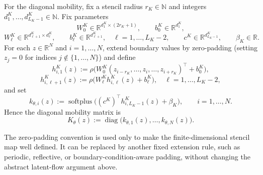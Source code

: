 \documentclass[hidelinks,review,nohypdvips,onefignum,onetabnum]{siamart220329}
\newcommand{\N}{\mathbb{N}}
\newcommand{\R}{\mathbb{R}}
\newcommand{\diag}{\operatorname{diag}}
\newcommand{\softplus}{\operatorname{softplus}}
\begin{document}
\begin{definition}
For the diagonal mobility, fix a stencil radius \(r_K\in \N\) and integers \(d_1^K,\dots,d_{L_K-1}^K\in \N\). Fix parameters
\begin{equation}\label{eq:K-params}
W_0^K\in \R^{d_1^K\times (2r_K+1)}, \qquad b_0^K\in \R^{d_1^K},
\end{equation}
\begin{equation*}
W_{\ell}^K\in \R^{d_{\ell+1}^K\times d_{\ell}^K}, \qquad b_{\ell}^K\in \R^{d_{\ell+1}^K}, \quad \ell=1,\dots,L_K-2,
\qquad c^K\in \R^{d_{L_K-1}^K}, \qquad \beta_K\in \R.
\end{equation*}
For each \(z\in\R^N\) and \(i=1,\dots,N\), extend boundary values by zero-padding (setting \(z_j=0\) for indices \(j\notin\{1,\dots,N\}\)) and define
\begin{equation}\label{eq:K-hidden}
h_{i,1}^K(z):=\rho\bigl(W_0^K(z_{i-r_K},\dots,z_i,\dots,z_{i+r_K})^\top+b_0^K\bigr),
\end{equation}
\begin{equation*}
h_{i,\ell+1}^K(z):=\rho\bigl(W_{\ell}^K h_{i,\ell}^K(z)+b_{\ell}^K\bigr), \quad \ell=1,\dots,L_K-2,
\end{equation*}
and set
\begin{equation}\label{eq:k-param}
k_{\theta,i}(z):=\softplus\bigl((c^K)^\top h_{i,L_K-1}^K(z)+\beta_K\bigr), \qquad i=1,\dots,N.
\end{equation}
Hence the diagonal mobility matrix is
\begin{equation}\label{eq:K-matrix}
K_{\theta}(z):=\diag\bigl(k_{\theta,1}(z),\dots,k_{\theta,N}(z)\bigr).
\end{equation}
\end{definition}

The zero-padding convention is used only to make the finite-dimensional stencil map well defined. It can be replaced by another fixed extension rule, such as periodic, reflective, or boundary-condition-aware padding, without changing the abstract latent-flow argument above.
\end{document}
